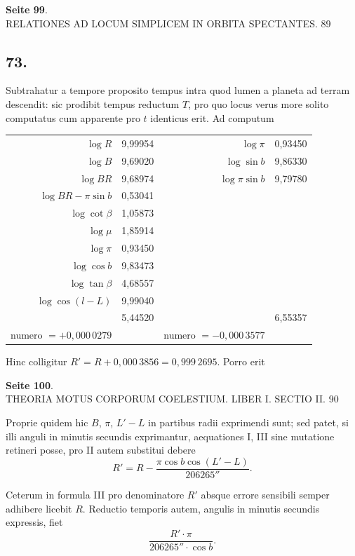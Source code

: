 \documentclass[12pt,a4paper]{article}
\begin{document}
\textbf{Seite 99}.\\
RELATIONES AD LOCUM SIMPLICEM IN ORBITA SPECTANTES. 89

\subsection*{73.}

Subtrahatur a tempore proposito tempus intra quod lumen a planeta ad terram descendit: sic prodibit tempus reductum $T$, pro quo locus verus more solito computatus cum apparente pro $t$ identicus erit. Ad computum

\begin{center}
\begin{tabular}{r@{\;\ldots\ldots\;}l@{\qquad}r@{\;\ldots\ldots\;}l}
$\log R$ & 9,99954 & $\log \pi$ & 0,93450 \\
$\log B$ & 9,69020 & $\log \sin b$ & 9,86330 \\
\hline
$\log BR$ & 9,68974 & $\log \pi \sin b$ & 9,79780 \\
\hline
$\log BR - \pi \sin b$ & 0,53041 \\
$\log \cot \beta$ & 1,05873 \\
$\log \mu$ & 1,85914 \\
$\log \pi$ & 0,93450 \\
$\log \cos b$ & 9,83473 \\
$\log \tan \beta$ & 4,68557 \\
$\log \cos(l - L)$ & 9,99040 \\
\hline
& 5,44520 & & 6,55357 \\
\hline
numero $= +0{,}000\,0279$ & & numero $= -0{,}000\,3577$ & \\
\end{tabular}
\end{center}

Hinc colligitur $R' = R + 0{,}000\,3856 = 0{,}999\,2695$. Porro erit

\textbf{Seite 100}.\\
THEORIA MOTUS CORPORUM COELESTIUM. LIBER I. SECTIO II. 90

Proprie quidem hic $B$, $\pi$, $L' - L$ in partibus radii exprimendi sunt; sed patet, si illi anguli in minutis secundis exprimantur, aequationes I, III sine mutatione retineri posse, pro II autem substitui debere
\[
R' = R - \frac{\pi \cos b \cos(L' - L)}{206265''}.
\]

Ceterum in formula III pro denominatore $R'$ absque errore sensibili semper adhibere licebit $R$. Reductio temporis autem, angulis in minutis secundis expressis, fiet
\[
\frac{R' \cdot \pi}{206265'' \cdot \cos b}.
\]
\end{document}
